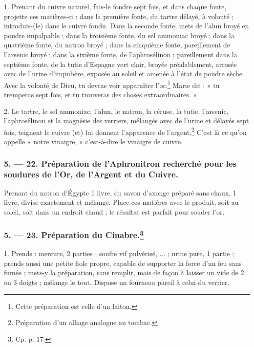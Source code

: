 \documentclass[a4paper, 11pt, oneside, polutonikogreek, french]{article}
\begin{document}
1. Prenant du cuivre naturel, fais-le fondre sept fois, et dans chaque fonte, projette ces matières-ci : dans la première fonte, du tartre délayé, à volonté ; introduis-(le) dans le cuivre fondu. Dans la seconde fonte, mets de l'alun broyé en poudre impalpable ; dans la troisième fonte, du sel ammoniac broyé ; dans la quatrième fonte, du natron broyé ; dans la cinquième fonte, pareillement de l'arsenic broyé ; dans la sixième fonte, de l'aphrosélinon ; pareillement dans la septième fonte, de la tutie d'Espagne vert clair, broyée préalablement, arrosée avec de l'urine d'impubère, exposée au soleil et amenée à l'état de poudre sèche. Avec la volonté de Dieu, tu devras voir apparaître l'or.\footnote{Cette préparation est celle d'un laiton.} Marie dit : « tu tremperas sept fois, et tu trouveras des choses extraordinaires. »

2. Le tartre, le sel ammoniac, l'alun, le natron, la céruse, la tutie, l'arsenic, l'aphrosélinon et la magnésie des verriers, mélangés avec de l'urine et délayés sept fois, teignent le cuivre (et) lui donnent l'apparence de l'argent.\footnote{Préparation d'un alliage analogue au tombac.} C'est là ce qu'on appelle « notre vinaigre, » c'est-à-dire le vinaigre de cuivre.

\bigskip
\centerline{\EightStarTaper}
\centerline{\EightStarTaper\EightStarTaper}
\bigskip

\subsubsection{5. --- 22. Préparation de l'Aphronitron recherché pour les soudures de l'Or, de l'Argent et du Cuivre.}

Prenant du natron d'Égypte 1 livre, du savon d'axonge préparé sans chaux, 1 livre, divise exactement et mélange. Place ces matières avec le produit, soit au soleil, soit dans un endroit chaud ; le résultat est parfait pour souder l'or.

\bigskip
\centerline{\EightStarTaper}
\centerline{\EightStarTaper\EightStarTaper}
\bigskip

\subsubsection[5. --- 23. Préparation du Cinabre.]{5. --- 23. Préparation du Cinabre.\footnote{Cp. p. 17.}}

1. Prends : mercure, 2 parties ; soufre vif pulvérisé, ... ; urine pure, 1 partie ; prends aussi une petite fiole propre, capable de supporter la force d'un feu sans fumée ; mets-y la préparation, sans remplir, mais de façon à laisser un vide de 2 ou 3 doigts ; mélange le tout. Dispose un fourneau pareil à celui du verrier.
\end{document}
